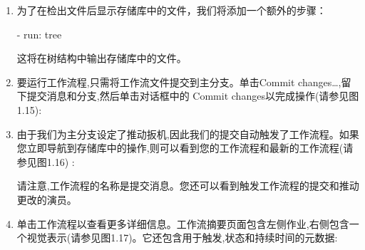 \begin{enumerate}
在工作流编辑器的右侧是市场。您可以在此直接搜索各种操作。搜索结帐并从操作中找到动作(这些是GitHub的内置操作)。在列表中,您会看到动作的所有者,最新版本和存储库的星星。清单包含一个安装部分,您可以将其复制到工作流中以使用该操作(请参见图1.14):


请注意，许多参数都是可选的。要查看存储库，您只需要以下几行：

\begin{shell}
- name: Checkout
  uses: actions/checkout@v4.1.0
\end{shell}

\begin{myNotic}{使用github动作}
操作请参阅Github上的位置。语法为\{path\}@\{ref\}。路径指向GitHub上的物理位置, 如果操作位于存储库的根或\{owner\}/\{repo\}/\{path\}如果操作在子文件夹中,则可以是\{orsal\}/\{repo\}。 @\{ref\}之后的引用是指向提交的任何git引用。它可以是标签,分支或个人提交SHA。
\end{myNotic}

\item 
为了在检出文件后显示存储库中的文件，我们将添加一个额外的步骤：

\begin{shell}
- run: tree
\end{shell}

这将在树结构中输出存储库中的文件。

\item 
要运行工作流程,只需将工作流文件提交到主分支。单击Commit changes…,留下提交消息和分支,然后单击对话框中的 Commit changes以完成操作(请参见图1.15):


\item 
由于我们为主分支设定了推动扳机,因此我们的提交自动触发了工作流程。如果您立即导航到存储库中的操作,则可以看到您的工作流程和最新的工作流程(请参见图1.16) :


请注意,工作流程的名称是提交消息。您还可以看到触发工作流程的提交和推动更改的演员。

\item 
单击工作流程以查看更多详细信息。工作流摘要页面包含左侧作业,右侧包含一个视觉表示(请参见图1.17)。它还包含用于触发,状态和持续时间的元数据:



\end{enumerate}
